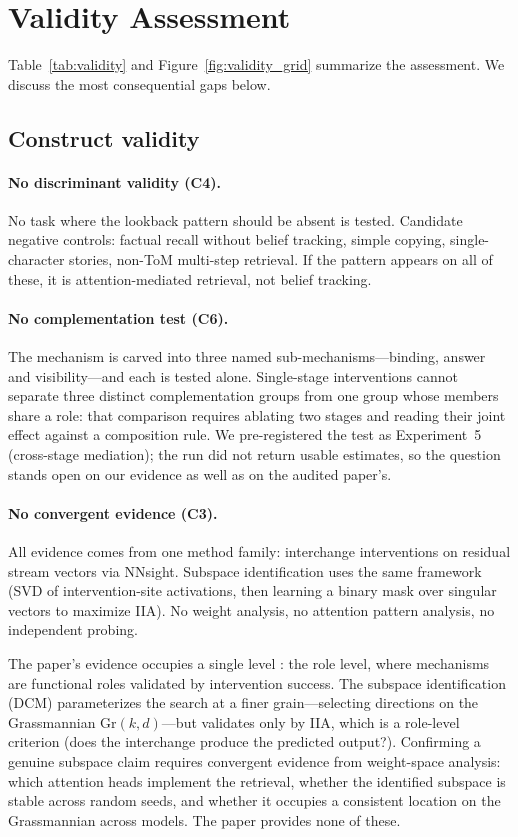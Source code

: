 \documentclass{article}
\begin{document}
\section{Validity Assessment}
\label{sec:validity}

Table~\ref{tab:validity} and Figure~\ref{fig:validity_grid} summarize the assessment. We discuss the most consequential gaps below.

\subsection{Construct validity}

\paragraph{No discriminant validity (C4).}
No task where the lookback pattern should be absent is tested. Candidate negative controls: factual recall without belief tracking, simple copying, single-character stories, non-ToM multi-step retrieval. If the pattern appears on all of these, it is attention-mediated retrieval, not belief tracking.

\paragraph{No complementation test (C6).}
The mechanism is carved into three named sub-mechanisms---binding, answer and
visibility---and each is tested alone. Single-stage interventions cannot separate three
distinct complementation groups from one group whose members share a role: that comparison
requires ablating two stages and reading their joint effect against a composition rule. We
pre-registered the test as Experiment~5 (cross-stage mediation); the run did not return
usable estimates, so the question stands open on our evidence as well as on the audited
paper's.

\paragraph{No convergent evidence (C3).}
All evidence comes from one method family: interchange interventions on residual stream vectors via NNsight. Subspace identification uses the same framework (SVD of intervention-site activations, then learning a binary mask over singular vectors to maximize IIA). No weight analysis, no attention pattern analysis, no independent probing.

The paper's evidence occupies a single level \citep{tower2026mechviews}: the role level, where mechanisms are functional roles validated by intervention success. The subspace identification (DCM) parameterizes the search at a finer grain---selecting directions on the Grassmannian $\text{Gr}(k, d)$---but validates only by IIA, which is a role-level criterion (does the interchange produce the predicted output?). Confirming a genuine subspace claim requires convergent evidence from weight-space analysis: which attention heads implement the retrieval, whether the identified subspace is stable across random seeds, and whether it occupies a consistent location on the Grassmannian across models. The paper provides none of these.
\end{document}
